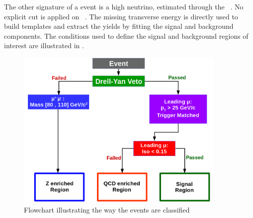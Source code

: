The other signature of a \W event is a high \pt neutrino, estimated through the \ETslash\ . No explicit cut is applied on \ETslash\ . The missing transverse energy is directly used to build templates and extract the yields by fitting the signal and background components. The conditions used to define the signal and background regions of interest are illustrated in .

\begin{figure}[htb]
 \begin{center}
   \includegraphics[width=0.9\textwidth]{Figures/WBoson/Analysis/EventSelection/FlowChar.png}
   \caption{Flowchart illustrating the way the events are classified}
   \label{fig:EventSelectionDiagram}
 \end{center}
\end{figure}


\clearpage

